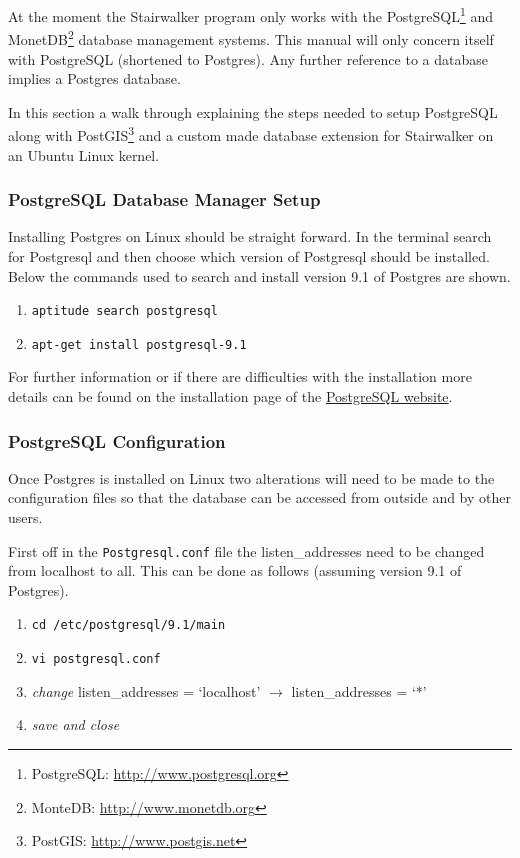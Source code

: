 At the moment the Stairwalker program only works with the PostgreSQL\footnote{PostgreSQL: \url{http://www.postgresql.org}} and MonetDB\footnote{MonteDB: \url{http://www.monetdb.org}} database management systems. This manual will only concern itself with PostgreSQL (shortened to Postgres). Any further reference to a database implies a Postgres database.

In this section a walk through explaining the steps needed to setup PostgreSQL along with PostGIS\footnote{PostGIS: \url{http://www.postgis.net}} and a custom made database extension for Stairwalker on an Ubuntu Linux kernel.

\subsubsection{PostgreSQL Database Manager Setup}
Installing Postgres on Linux should be straight forward. In the terminal search for Postgresql and then choose which version of Postgresql should be installed. Below the commands used to search and install version 9.1 of Postgres are shown.
\begin{enumerate}
	\item \lstinline|aptitude search postgresql|
	\item \lstinline|apt-get install postgresql-9.1|
\end{enumerate}
For further information or if there are difficulties with the installation more details can be found on the installation page of the \href{http://www.postgresql.org/download/}{PostgreSQL website}.  

\subsubsection{PostgreSQL Configuration}
Once Postgres is installed on Linux two alterations will need to be made to the configuration files so that the database can be accessed from outside and by other users.

First off in the \lstinline|Postgresql.conf| file the listen\_addresses need to be changed from localhost to all. This can be done as follows (assuming version 9.1 of Postgres).

\begin{enumerate}
	\item \lstinline|cd /etc/postgresql/9.1/main|
	\item \lstinline|vi postgresql.conf|
	\item \textit{change} listen\_addresses = `localhost' $\rightarrow$ listen\_addresses = `*'
	\item \textit{save and close}
\end{enumerate}

